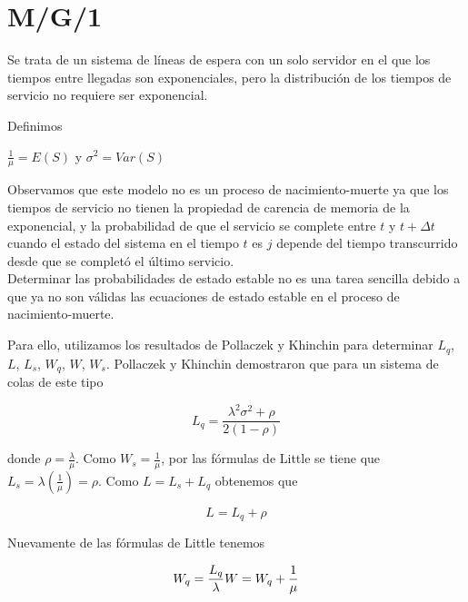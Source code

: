 
\section{M/G/1}


Se trata de un sistema de líneas de espera con un solo servidor en el que los tiempos entre llegadas son exponenciales, pero la distribución de los tiempos de servicio no requiere ser exponencial.

Definimos

\begin{center}
$\frac{1}{\mu}=E(S)$ y   $\sigma^2= Var(S)$
\end{center}

Observamos que este modelo no es un proceso de nacimiento-muerte ya que los tiempos de servicio no tienen la propiedad de carencia de memoria de la exponencial, y la probabilidad de que el servicio se complete entre $t$ y $t + \Delta t$ cuando el estado del sistema en el tiempo $t$ es $j$ depende del tiempo transcurrido desde que se completó el último servicio.\\

Determinar las probabilidades de estado estable no es una tarea sencilla debido a que ya no son válidas las ecuaciones de estado estable en el proceso de nacimiento-muerte.

Para ello, utilizamos los resultados de Pollaczek y Khinchin para determinar $L_q$, $L$, $L_s$, $W_q$, $W$, $W_s$. Pollaczek y Khinchin demostraron que para un sistema de colas de este tipo

\begin{equation}
L_q=\frac{\lambda^2 \sigma^2+\rho}{2(1-\rho)}
\end{equation}

donde $\rho=\displaystyle\frac{\lambda}{\mu}$. Como $W_s=\displaystyle\frac{1}{\mu}$, por las fórmulas de Little se tiene que $L_s=\lambda\left(\displaystyle\frac{1}{\mu}\right)=\rho$. Como $L=L_s+L_q$ obtenemos que

\begin{equation}
L=L_q+\rho
\end{equation}

Nuevamente de las fórmulas de Little tenemos

\begin{equation}
W_q=\frac{L_q}{\lambda}\\
W=W_q+\frac{1}{\mu}
\end{equation}
